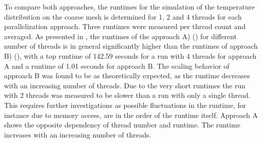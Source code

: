 To compare both approaches, the runtimes for the simulation of the temperature distribution on the coarse mesh is determined for 1, 2 and 4 threads for each parallelization approach. Three runtimes were measured per thread count and averaged. 
As presented in , the runtimes of the approach A) () for different number of threads is in general significantly higher than the runtimes of approach B) (), with a top runtime of 142.59 seconds for a run with 4 threads for approach A and a runtime of 1.01 seconds for approach B. The scaling behavior of approach B was found to be as theoretically expected, as the runtime decreases with an increasing number of threads. Due to the very short runtimes the run with 2 threads was measured to be slower than a run with only a single thread. This requires further investigations as possible fluctuations in the runtime, for instance due to memory access, are in the order of the runtime itself. Approach A shows the opposite dependency of thread number and runtime. The runtime increases with an increasing number of threads. 

